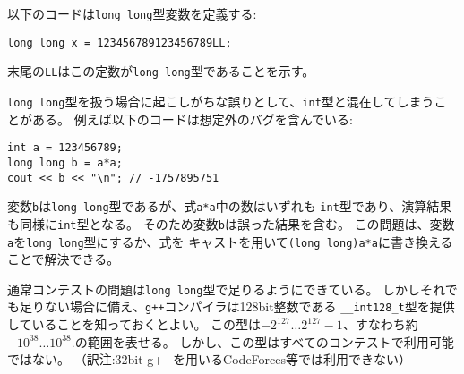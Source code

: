 以下のコードは\texttt{long long}型変数を定義する:
\begin{lstlisting}
long long x = 123456789123456789LL;
\end{lstlisting}
末尾の\texttt{LL}はこの定数が\texttt{long long}型であることを示す。

\texttt{long long}型を扱う場合に起こしがちな誤りとして、\texttt{int}型と混在してしまうことがある。
例えば以下のコードは想定外のバグを含んでいる:

\begin{lstlisting}
int a = 123456789;
long long b = a*a;
cout << b << "\n"; // -1757895751
\end{lstlisting}

\begin{comment}
Even though the variable \texttt{b} is of type \texttt{long long},
both numbers in the expression \texttt{a*a}
are of type \texttt{int} and the result is
also of type \texttt{int}.
Because of this, the variable \texttt{b} will
contain a wrong result.
The problem can be solved by changing the type
of \texttt{a} to \texttt{long long} or
by changing the expression to \texttt{(long long)a*a}.

Usually contest problems are set so that the
type \texttt{long long} is enough.
Still, it is good to know that
the \texttt{g++} compiler also provides
a 128-bit type \texttt{\_\_int128\_t}
with a value range of
$-2^{127} \ldots 2^{127}-1$ or about $-10^{38} \ldots 10^{38}$.
However, this type is not available in all contest systems.
\end{comment}

変数\texttt{b}は\texttt{long long}型であるが、式\texttt{a*a}中の数はいずれも
\texttt{int}型であり、演算結果も同様に\texttt{int}型となる。
そのため変数\texttt{b}は誤った結果を含む。
この問題は、変数\texttt{a}を\texttt{long long}型にするか、式を
キャストを用いて\texttt{(long long)a*a}に書き換えることで解決できる。

通常コンテストの問題は\texttt{long long}型で足りるようにできている。
しかしそれでも足りない場合に備え、\texttt{g++}コンパイラは128bit整数である
\texttt{\_\_int128\_t}型を提供していることを知っておくとよい。
この型は$-2^{127} \ldots 2^{127}-1$、すなわち約$-10^{38} \ldots 10^{38}$.の範囲を表せる。
しかし、この型はすべてのコンテストで利用可能ではない。
（訳注:32bit g++を用いるCodeForces等では利用できない）

\begin{comment}
\subsubsection{Modular arithmetic}

\index{remainder}
\index{modular arithmetic}
\end{comment}

